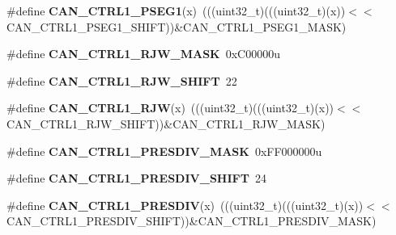 \begin{DoxyCompactItemize}
\item 
\#define {\bfseries C\+A\+N\+\_\+\+C\+T\+R\+L1\+\_\+\+P\+S\+E\+G1}(x)~(((uint32\+\_\+t)(((uint32\+\_\+t)(x))$<$$<$C\+A\+N\+\_\+\+C\+T\+R\+L1\+\_\+\+P\+S\+E\+G1\+\_\+\+S\+H\+I\+FT))\&C\+A\+N\+\_\+\+C\+T\+R\+L1\+\_\+\+P\+S\+E\+G1\+\_\+\+M\+A\+SK)\hypertarget{group__CAN__Register__Masks_ga513ec9c9968b0f6971bdd54c2524d919}{}\label{group__CAN__Register__Masks_ga513ec9c9968b0f6971bdd54c2524d919}

\item 
\#define {\bfseries C\+A\+N\+\_\+\+C\+T\+R\+L1\+\_\+\+R\+J\+W\+\_\+\+M\+A\+SK}~0x\+C00000u\hypertarget{group__CAN__Register__Masks_ga10512d44b72e4fcf8fff8052dba9fd3a}{}\label{group__CAN__Register__Masks_ga10512d44b72e4fcf8fff8052dba9fd3a}

\item 
\#define {\bfseries C\+A\+N\+\_\+\+C\+T\+R\+L1\+\_\+\+R\+J\+W\+\_\+\+S\+H\+I\+FT}~22\hypertarget{group__CAN__Register__Masks_ga6fbcc0f866380f763269138136a2a92e}{}\label{group__CAN__Register__Masks_ga6fbcc0f866380f763269138136a2a92e}

\item 
\#define {\bfseries C\+A\+N\+\_\+\+C\+T\+R\+L1\+\_\+\+R\+JW}(x)~(((uint32\+\_\+t)(((uint32\+\_\+t)(x))$<$$<$C\+A\+N\+\_\+\+C\+T\+R\+L1\+\_\+\+R\+J\+W\+\_\+\+S\+H\+I\+FT))\&C\+A\+N\+\_\+\+C\+T\+R\+L1\+\_\+\+R\+J\+W\+\_\+\+M\+A\+SK)\hypertarget{group__CAN__Register__Masks_gaa54623c269b62894c35c88d10102f17b}{}\label{group__CAN__Register__Masks_gaa54623c269b62894c35c88d10102f17b}

\item 
\#define {\bfseries C\+A\+N\+\_\+\+C\+T\+R\+L1\+\_\+\+P\+R\+E\+S\+D\+I\+V\+\_\+\+M\+A\+SK}~0x\+F\+F000000u\hypertarget{group__CAN__Register__Masks_gad8d384c87d48a3fc0b1ae52949823818}{}\label{group__CAN__Register__Masks_gad8d384c87d48a3fc0b1ae52949823818}

\item 
\#define {\bfseries C\+A\+N\+\_\+\+C\+T\+R\+L1\+\_\+\+P\+R\+E\+S\+D\+I\+V\+\_\+\+S\+H\+I\+FT}~24\hypertarget{group__CAN__Register__Masks_ga762ed1bd89d4db4a6f34a12f8ae0afcf}{}\label{group__CAN__Register__Masks_ga762ed1bd89d4db4a6f34a12f8ae0afcf}

\item 
\#define {\bfseries C\+A\+N\+\_\+\+C\+T\+R\+L1\+\_\+\+P\+R\+E\+S\+D\+IV}(x)~(((uint32\+\_\+t)(((uint32\+\_\+t)(x))$<$$<$C\+A\+N\+\_\+\+C\+T\+R\+L1\+\_\+\+P\+R\+E\+S\+D\+I\+V\+\_\+\+S\+H\+I\+FT))\&C\+A\+N\+\_\+\+C\+T\+R\+L1\+\_\+\+P\+R\+E\+S\+D\+I\+V\+\_\+\+M\+A\+SK)\hypertarget{group__CAN__Register__Masks_ga984ade68da6423e2afc012f0979221d7}{}\label{group__CAN__Register__Masks_ga984ade68da6423e2afc012f0979221d7}


\end{DoxyCompactItemize}
